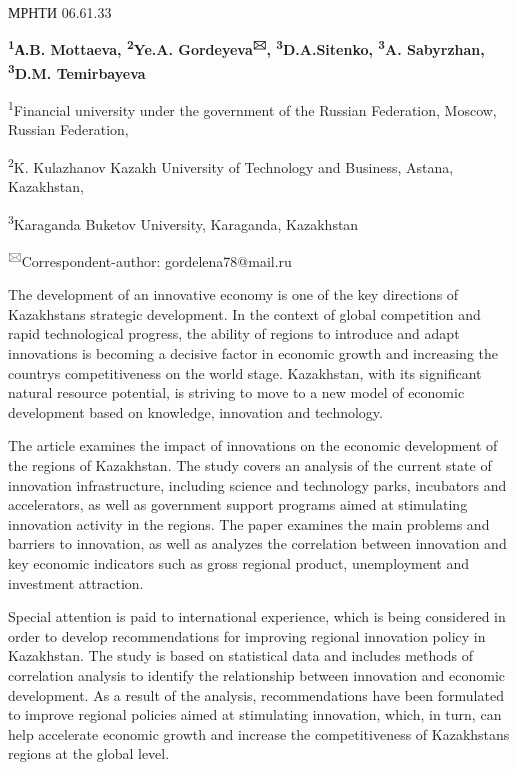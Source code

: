 
\newpage
МРНТИ 06.61.33


\begin{center}
{\bfseries \textsuperscript{1}А.B. Mottaeva, \textsuperscript{2}Ye.A. Gordeyeva\textsuperscript{🖂}, \textsuperscript{3}D.A.Sitenko, \textsuperscript{3}A. Sabyrzhan, \textsuperscript{3}D.M. Temirbayeva}

\textsuperscript{1}Financial university under the government of the
Russian Federation, Moscow, Russian Federation,

\textsuperscript{2}K. Kulazhanov Kazakh University of Technology and
Business, Astana, Kazakhstan,

\textsuperscript{3}Karaganda Buketov University, Karaganda, Kazakhstan
\end{center}

\textsuperscript{🖂}Correspondent-author: gordelena78@mail.ru

The development of an innovative economy is one of the key directions of
Kazakhstan\textquotesingle s strategic development. In the context of
global competition and rapid technological progress, the ability of
regions to introduce and adapt innovations is becoming a decisive factor
in economic growth and increasing the country\textquotesingle s
competitiveness on the world stage. Kazakhstan, with its significant
natural resource potential, is striving to move to a new model of
economic development based on knowledge, innovation and technology.

The article examines the impact of innovations on the economic
development of the regions of Kazakhstan. The study covers an analysis
of the current state of innovation infrastructure, including science and
technology parks, incubators and accelerators, as well as government
support programs aimed at stimulating innovation activity in the
regions. The paper examines the main problems and barriers to
innovation, as well as analyzes the correlation between innovation and
key economic indicators such as gross regional product, unemployment and
investment attraction.

Special attention is paid to international experience, which is being
considered in order to develop recommendations for improving regional
innovation policy in Kazakhstan. The study is based on statistical data
and includes methods of correlation analysis to identify the
relationship between innovation and economic development. As a result of
the analysis, recommendations have been formulated to improve regional
policies aimed at stimulating innovation, which, in turn, can help
accelerate economic growth and increase the competitiveness of
Kazakhstan\textquotesingle s regions at the global level.

